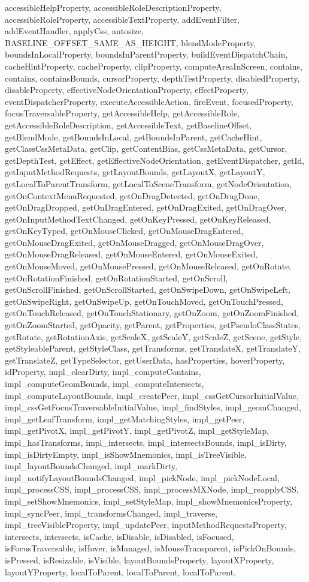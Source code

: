 {{{{{{{{{{{{{{{{{{{{{{accessibleHelpProperty, accessibleRoleDescriptionProperty, accessibleRoleProperty, accessibleTextProperty, addEventFilter, addEventHandler, applyCss, autosize, BASELINE\_OFFSET\_SAME\_AS\_HEIGHT, blendModeProperty, boundsInLocalProperty, boundsInParentProperty, buildEventDispatchChain, cacheHintProperty, cacheProperty, clipProperty, computeAreaInScreen, contains, contains, containsBounds, cursorProperty, depthTestProperty, disabledProperty, disableProperty, effectiveNodeOrientationProperty, effectProperty, eventDispatcherProperty, executeAccessibleAction, fireEvent, focusedProperty, focusTraversableProperty, getAccessibleHelp, getAccessibleRole, getAccessibleRoleDescription, getAccessibleText, getBaselineOffset, getBlendMode, getBoundsInLocal, getBoundsInParent, getCacheHint, getClassCssMetaData, getClip, getContentBias, getCssMetaData, getCursor, getDepthTest, getEffect, getEffectiveNodeOrientation, getEventDispatcher, getId, getInputMethodRequests, getLayoutBounds, getLayoutX, getLayoutY, getLocalToParentTransform, getLocalToSceneTransform, getNodeOrientation, getOnContextMenuRequested, getOnDragDetected, getOnDragDone, getOnDragDropped, getOnDragEntered, getOnDragExited, getOnDragOver, getOnInputMethodTextChanged, getOnKeyPressed, getOnKeyReleased, getOnKeyTyped, getOnMouseClicked, getOnMouseDragEntered, getOnMouseDragExited, getOnMouseDragged, getOnMouseDragOver, getOnMouseDragReleased, getOnMouseEntered, getOnMouseExited, getOnMouseMoved, getOnMousePressed, getOnMouseReleased, getOnRotate, getOnRotationFinished, getOnRotationStarted, getOnScroll, getOnScrollFinished, getOnScrollStarted, getOnSwipeDown, getOnSwipeLeft, getOnSwipeRight, getOnSwipeUp, getOnTouchMoved, getOnTouchPressed, getOnTouchReleased, getOnTouchStationary, getOnZoom, getOnZoomFinished, getOnZoomStarted, getOpacity, getParent, getProperties, getPseudoClassStates, getRotate, getRotationAxis, getScaleX, getScaleY, getScaleZ, getScene, getStyle, getStyleableParent, getStyleClass, getTransforms, getTranslateX, getTranslateY, getTranslateZ, getTypeSelector, getUserData, hasProperties, hoverProperty, idProperty, impl\_clearDirty, impl\_computeContains, impl\_computeGeomBounds, impl\_computeIntersects, impl\_computeLayoutBounds, impl\_createPeer, impl\_cssGetCursorInitialValue, impl\_cssGetFocusTraversableInitialValue, impl\_findStyles, impl\_geomChanged, impl\_getLeafTransform, impl\_getMatchingStyles, impl\_getPeer, impl\_getPivotX, impl\_getPivotY, impl\_getPivotZ, impl\_getStyleMap, impl\_hasTransforms, impl\_intersects, impl\_intersectsBounds, impl\_isDirty, impl\_isDirtyEmpty, impl\_isShowMnemonics, impl\_isTreeVisible, impl\_layoutBoundsChanged, impl\_markDirty, impl\_notifyLayoutBoundsChanged, impl\_pickNode, impl\_pickNodeLocal, impl\_processCSS, impl\_processCSS, impl\_processMXNode, impl\_reapplyCSS, impl\_setShowMnemonics, impl\_setStyleMap, impl\_showMnemonicsProperty, impl\_syncPeer, impl\_transformsChanged, impl\_traverse, impl\_treeVisibleProperty, impl\_updatePeer, inputMethodRequestsProperty, intersects, intersects, isCache, isDisable, isDisabled, isFocused, isFocusTraversable, isHover, isManaged, isMouseTransparent, isPickOnBounds, isPressed, isResizable, isVisible, layoutBoundsProperty, layoutXProperty, layoutYProperty, localToParent, localToParent, localToParent, }}}}}}}}}}}}}}}}}}}}}}

